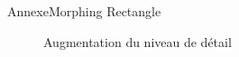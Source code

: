 \begin{frame}{Annexe}{Morphing Rectangle}
\begin{figure}[H]
{   }
\end{figure}
\begin{figure}[H]
   
   \caption{Augmentation du niveau de détail}
\end{figure}
    
\end{frame}

